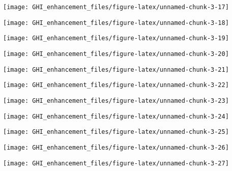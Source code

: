 \documentclass[
  11pt,
  a4paper,oneside]{article}
\begin{document}
\begin{center}\texttt{[image: GHI\_enhancement\_files/figure-latex/unnamed-chunk-3-17]} \end{center}

\begin{center}\texttt{[image: GHI\_enhancement\_files/figure-latex/unnamed-chunk-3-18]} \end{center}

\begin{center}\texttt{[image: GHI\_enhancement\_files/figure-latex/unnamed-chunk-3-19]} \end{center}

\begin{center}\texttt{[image: GHI\_enhancement\_files/figure-latex/unnamed-chunk-3-20]} \end{center}

\begin{center}\texttt{[image: GHI\_enhancement\_files/figure-latex/unnamed-chunk-3-21]} \end{center}

\begin{center}\texttt{[image: GHI\_enhancement\_files/figure-latex/unnamed-chunk-3-22]} \end{center}

\begin{center}\texttt{[image: GHI\_enhancement\_files/figure-latex/unnamed-chunk-3-23]} \end{center}

\begin{center}\texttt{[image: GHI\_enhancement\_files/figure-latex/unnamed-chunk-3-24]} \end{center}

\begin{center}\texttt{[image: GHI\_enhancement\_files/figure-latex/unnamed-chunk-3-25]} \end{center}

\begin{center}\texttt{[image: GHI\_enhancement\_files/figure-latex/unnamed-chunk-3-26]} \end{center}

\begin{center}\texttt{[image: GHI\_enhancement\_files/figure-latex/unnamed-chunk-3-27]} \end{center}
\end{document}
